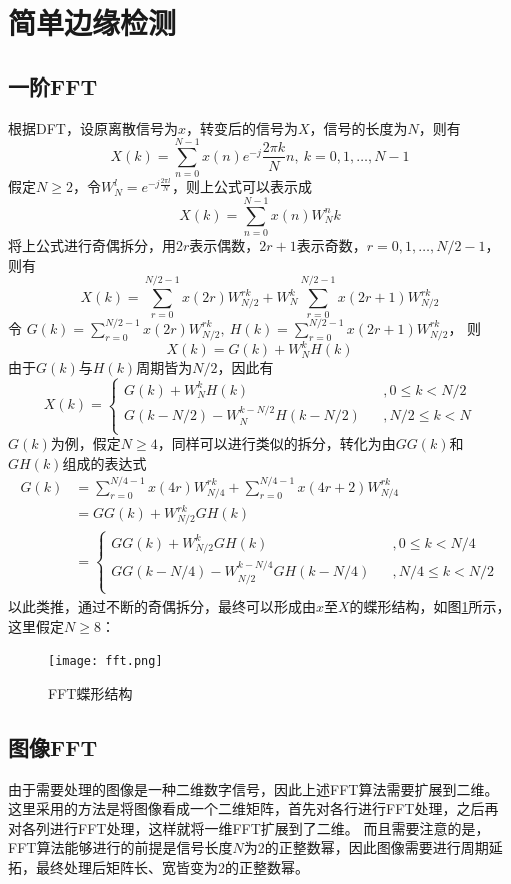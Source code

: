 \documentclass[UTF8]{ctexart}
\begin{document}
\iffalse

	\section{简单边缘检测}

		\subsection{一阶FFT}
		根据DFT，设原离散信号为$x$，转变后的信号为$X$，信号的长度为$N$，则有
		\[
			X(k) = \sum_{n=0}^{N-1}x(n)e^{-j}\frac{2\pi k}{N}n,\ k=0,1,\ldots,N-1
		\]
		假定$N \ge 2$，令$W_N^l=e^{-j\frac{2\pi l}{N}}$，则上公式可以表示成
		\[
			X(k)=\sum_{n=0}^{N-1}x(n)W_N^nk
		\]
		将上公式进行奇偶拆分，用$2r$表示偶数，$2r+1$表示奇数，$r=0,1,\ldots,N/2-1$，则有
		\[
			X(k) = \sum_{r=0}^{N/2-1}x(2r)W_{N/2}^{rk}+W_N^k\sum_{r=0}^{N/2-1}x(2r+1)W_{N/2}^{rk}
		\]
		令
		$
			G(k)=\sum_{r=0}^{N/2-1}x(2r)W_{N/2}^{rk}
		,\  
			H(k)=\sum_{r=0}^{N/2-1}x(2r+1)W_{N/2}^{rk}
		$，
		则
		\[
			X(k)=G(k)+W_N^kH(k)
		\]
		由于$G(k)$与$H(k)$周期皆为$N/2$，因此有
		\[
			X(k)=\left\{
			\begin{array}{lcl}
			G(k) + W_N^kH(k) & & ,{0 \leq k < N/2} \\
			G(k-N/2)-W_N^{k-N/2}H(k-N/2) & & ,{N/2 \leq k < N} \\
			\end{array}
			\right.
		\]
		$G(k)$为例，假定$N \ge 4$，同样可以进行类似的拆分，转化为由$GG(k)$和$GH(k)$组成的表达式
		\[
			\begin{aligned}
			G(k) &= \sum_{r=0}^{N/4-1}x(4r)W_{N/4}^{rk} + \sum_{r=0}^{N/4-1}x(4r+2)W_{N/4}^{rk} \\
			&= GG(k) + W_{N/2}^{rk}GH(k) \\
			&= \left\{
			\begin{array}{lcl}
			GG(k) + W_{N/2}^kGH(k) & & ,{0 \leq k < N/4} \\
			GG(k-N/4)-W_{N/2}^{k-N/4}GH(k-N/4) & & ,{N/4 \leq k < N/2} \\
			\end{array}
			\right.
			\end{aligned}
		\]
		以此类推，通过不断的奇偶拆分，最终可以形成由$x$至$X$的蝶形结构，如图\ref{fft-btf}所示，这里假定$N \ge 8$：
		\begin{figure}[]
			\centering
			\texttt{[image: fft.png]}
			\caption{FFT蝶形结构}
			\label{fft-btf}
		\end{figure}

	\subsection{图像FFT}
		由于需要处理的图像是一种二维数字信号，因此上述FFT算法需要扩展到二维。这里采用的方法是将图像看成一个二维矩阵，首先对各行进行FFT处理，之后再对各列进行FFT处理，这样就将一维FFT扩展到了二维。
		而且需要注意的是，FFT算法能够进行的前提是信号长度$N$为2的正整数幂，因此图像需要进行周期延拓，最终处理后矩阵长、宽皆变为2的正整数幂。
\end{document}
